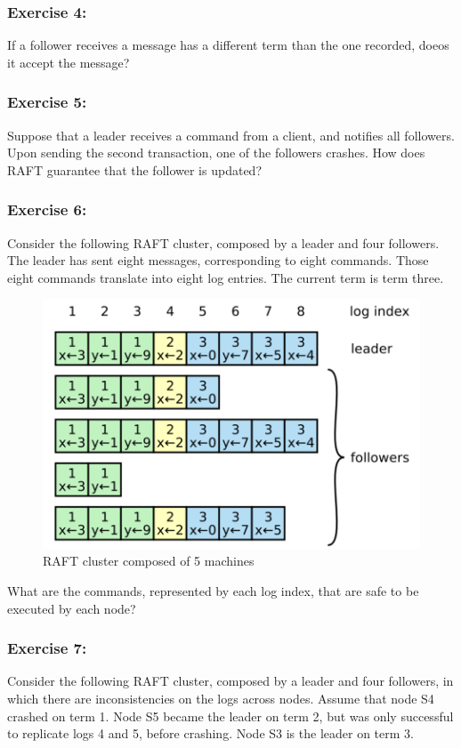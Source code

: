 \documentclass[12pt,a4paper]{article}
\begin{document}
\subsubsection*{Exercise 4:} If a follower receives a message has a different term than the one recorded, doeos it accept the message?  

\subsubsection*{Exercise 5:} Suppose that a leader receives a command from a client, and notifies all followers. Upon sending the second transaction, one of the followers crashes. How does RAFT guarantee that the follower is updated?



\subsubsection*{Exercise 6:} Consider the following RAFT cluster, composed by a leader and four followers. The leader has sent eight messages, corresponding to eight commands. Those eight commands translate into eight log entries. The current term is term three. 
\begin{figure}[H]
    \centering
    \includegraphics[scale=0.6]{figures/exercise.png}
    \caption{RAFT cluster composed of 5 machines}
    \label{fig:RAFT_cluster}
\end{figure}

What are the commands, represented by each log index, that are safe to be executed by each node?

\subsubsection*{Exercise 7:} Consider the following RAFT cluster, composed by a leader and four followers, in which there are inconsistencies on the logs across nodes. Assume that node S4 crashed on term 1. Node S5 became the leader on term 2, but was only successful to replicate logs 4 and 5, before crashing. Node S3 is the leader on term 3.
\end{document}
